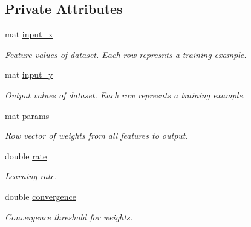 \subsection*{Private Attributes}
\begin{DoxyCompactItemize}
\item 
\mbox{\label{classLinearClassifier_aef5c644b35ada9f157961677a68f5342}} 
mat \hyperlink{classLinearClassifier_aef5c644b35ada9f157961677a68f5342}{input\+\_\+x}
\begin{DoxyCompactList}\small\item\em Feature values of dataset. Each row represnts a training example. \end{DoxyCompactList}\item 
\mbox{\label{classLinearClassifier_a48d9263d2b78c7e437f3ef4b4fccd5b5}} 
mat \hyperlink{classLinearClassifier_a48d9263d2b78c7e437f3ef4b4fccd5b5}{input\+\_\+y}
\begin{DoxyCompactList}\small\item\em Output values of dataset. Each row represnts a training example. \end{DoxyCompactList}\item 
\mbox{\label{classLinearClassifier_aa22e60a5adffc93fb4519dcb07a201d9}} 
mat \hyperlink{classLinearClassifier_aa22e60a5adffc93fb4519dcb07a201d9}{params}
\begin{DoxyCompactList}\small\item\em Row vector of weights from all features to output. \end{DoxyCompactList}\item 
\mbox{\label{classLinearClassifier_a15f1e976794a2e06c5eb2aff8e67cd48}} 
double \hyperlink{classLinearClassifier_a15f1e976794a2e06c5eb2aff8e67cd48}{rate}
\begin{DoxyCompactList}\small\item\em Learning rate. \end{DoxyCompactList}\item 
\mbox{\label{classLinearClassifier_a05eab9e5f3b75d7220c9bf6e547baebd}} 
double \hyperlink{classLinearClassifier_a05eab9e5f3b75d7220c9bf6e547baebd}{convergence}
\begin{DoxyCompactList}\small\item\em Convergence threshold for weights. \end{DoxyCompactList}\item 

\end{DoxyCompactItemize}
